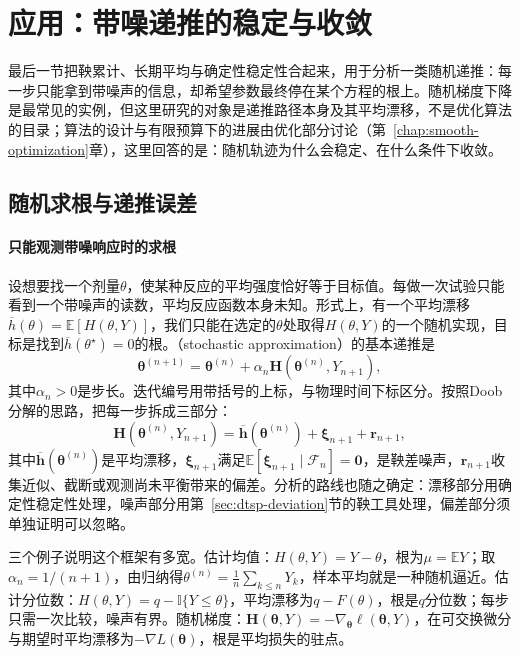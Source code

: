 \section{应用：带噪递推的稳定与收敛}
\label{sec:dtsp-stochastic-approximation}

最后一节把鞅累计、长期平均与确定性稳定性合起来，用于分析一类随机递推：每一步只能拿到带噪声的信息，却希望参数最终停在某个方程的根上。随机梯度下降是最常见的实例，但这里研究的对象是递推路径本身及其平均漂移，不是优化算法的目录；算法的设计与有限预算下的进展由优化部分讨论（第~\ref{chap:smooth-optimization}章），这里回答的是：随机轨迹为什么会稳定、在什么条件下收敛。

\subsection{随机求根与递推误差}
\label{sec:dtsp-root-finding}

\paragraph{只能观测带噪响应时的求根}
设想要找一个剂量$\theta$，使某种反应的平均强度恰好等于目标值。每做一次试验只能看到一个带噪声的读数，平均反应函数本身未知。形式上，有一个平均漂移$\overline h(\theta)=\mathbb E[H(\theta,Y)]$，我们只能在选定的$\theta$处取得$H(\theta,Y)$的一个随机实现，目标是找到$\overline h(\theta^\star)=0$的根。（stochastic approximation）的基本递推是
\begin{equation}
  \bm\theta^{(n+1)}=\bm\theta^{(n)}+\alpha_n\bm H(\bm\theta^{(n)},Y_{n+1}),
  \label{eq:dtsp-robbins-monro}
\end{equation}
其中$\alpha_n>0$是步长。迭代编号用带括号的上标，与物理时间下标区分。按照Doob分解的思路，把每一步拆成三部分：
\begin{equation}
  \bm H(\bm\theta^{(n)},Y_{n+1})=\overline{\bm h}(\bm\theta^{(n)})+\bm\xi_{n+1}+\bm r_{n+1},
  \label{eq:dtsp-sa-decomposition}
\end{equation}
其中$\overline{\bm h}(\bm\theta^{(n)})$是平均漂移，$\bm\xi_{n+1}$满足$\mathbb E[\bm\xi_{n+1}\mid\mathcal F_n]=\bm 0$，是鞅差噪声，$\bm r_{n+1}$收集近似、截断或观测尚未平衡带来的偏差。分析的路线也随之确定：漂移部分用确定性稳定性处理，噪声部分用第~\ref{sec:dtsp-deviation}节的鞅工具处理，偏差部分须单独证明可以忽略。

三个例子说明这个框架有多宽。估计均值：$H(\theta,Y)=Y-\theta$，根为$\mu=\mathbb EY$；取$\alpha_n=1/(n+1)$，由归纳得$\theta^{(n)}=\frac1n\sum_{k\leq n}Y_k$，样本平均就是一种随机逼近。估计分位数：$H(\theta,Y)=q-\mathbb I\{Y\leq\theta\}$，平均漂移为$q-F(\theta)$，根是$q$分位数；每步只需一次比较，噪声有界。随机梯度：$\bm H(\bm\theta,Y)=-\nabla_{\bm\theta}\ell(\bm\theta,Y)$，在可交换微分与期望时平均漂移为$-\nabla L(\bm\theta)$，根是平均损失的驻点。

